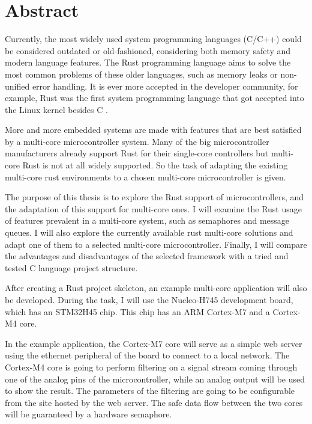\vfill
\selectenglish


\chapter*{Abstract}

Currently, the most widely used system programming languages (C/C++) could be considered outdated or old-fashioned, considering both memory safety and modern language features. The Rust programming language aims to solve the most common problems of these older languages, such as memory leaks or non-unified error handling. It is ever more accepted in the developer community, for example, Rust was the first system programming language that got accepted into the Linux kernel besides C \cite{FirstRustCommit}.

More and more embedded systems are made with features that are best satisfied by a multi-core microcontroller system. Many of the big microcontroller manufacturers already support Rust for their single-core controllers but multi-core Rust is not at all widely supported. So the task of adapting the existing multi-core rust environments to a chosen multi-core microcontroller is given.

The purpose of this thesis is to explore the Rust support of microcontrollers, and the adaptation of this support for multi-core ones. I will examine the Rust usage of features prevalent in a multi-core system, such as semaphores and message queues. I will also explore the currently available rust multi-core solutions and adapt one of them to a selected multi-core microcontroller. Finally, I will compare the advantages and disadvantages of the selected framework with a tried and tested C language project structure.

After creating a Rust project skeleton, an example multi-core application will also be developed. During the task, I will use the Nucleo-H745 development board, which has an STM32H45 chip. This chip has an ARM Cortex-M7 and a Cortex-M4 core.

In the example application, the Cortex-M7 core will serve as a simple web server using the ethernet peripheral of the board to connect to a local network. The Cortex-M4 core is going to perform filtering on a signal stream coming through one of the analog pins of the microcontroller, while an analog output will be used to show the result. The parameters of the filtering are going to be configurable from the site hosted by the web server. The safe data flow between the two cores will be guaranteed by a hardware semaphore.


\vfill
\selectthesislanguage

\setcounter{romanPage}{\value{page}}

